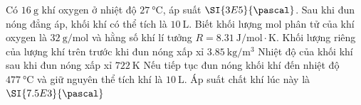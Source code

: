 \begin{ex}
	Có $\SI{16}{\gram}$ khí oxygen ở nhiệt độ $\SI{27}{\celsius}$, áp suất $\SI{3E5}{\pascal}$. Sau khi đun nóng đẳng áp, khối khí có thể tích là $\SI{10}{\liter}$. Biết khối lượng mol phân tử của khí oxygen là $\SI{32}{\gram/\mole}$ và hằng số khí lí tưởng $R=\SI{8.31}{\joule/\mole\cdot\kelvin}$.
	{\True Khối lượng riêng của lượng khí trên trước khi đun nóng xấp xỉ $\SI{3.85}{\kilogram/\meter^3}$}
	{\True Nhiệt độ của khối khí sau khi đun nóng xấp xỉ $\SI{722}{\kelvin}$}
	{Nếu tiếp tục đun nóng khối khí đến nhiệt độ $\SI{477}{\celsius}$ và giữ nguyên thể tích khí là $\SI{10}{\liter}$. Áp suất chất khí lúc này là $\SI{7.5E3}{\pascal}$}
\end{ex}
